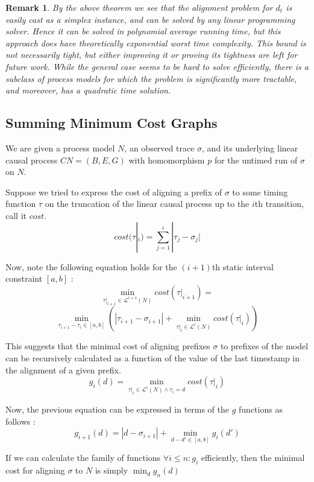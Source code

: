 \documentclass[conference]{IEEEtran}
\newtheorem{remark}{Remark}
\begin{document}
	\begin{remark}
		By the above theorem we see that the alignment problem for $d_t$ is easily cast as a simplex instance, and can be solved by any linear programming solver. 
		Hence it can be solved in polynomial average running time, but this approach does have theoretically exponential worst time complexity. 
		This bound is not necessarily tight, but either improving it or proving its tightness are left for future work. While the general case seems to be hard to solve efficiently, there is a subclass of process models for which the problem is significantly more tractable, and moreover, has a quadratic time solution. 
	\end{remark}
	
	\subsection{Summing Minimum Cost Graphs} 
	
	We are given a process model $N$, an observed trace $\sigma$, and its underlying linear causal process $CN = (B, E, G)$ with homomorphism $p$ for the untimed run of $\sigma$ on $N$. 
	
	Suppose we tried to express the cost of aligning a prefix of $\sigma$ to some timing function $\tau$ on the truncation of the linear causal process up to the $i$th transition, call it $cost$. 
	$$cost(\tau|_i) = \sum_{j = 1}^{i} |\tau_j - \sigma_j|$$
	
	Now, note the following equation holds for the $(i+1)$th static interval constraint $[a, b]$ : 
	$$\min_{\tau|_{i+1} \in \mathcal{L}^{i+1}(N)}cost(\tau|_{i+1}) = $$$$\min_{\tau_{i+1} - \tau_i\in [a, b]} (|\tau_{i+1} - \sigma_{i+1}| + \min_{\tau|_i \in \mathcal{L}^i(N) }cost(\tau|_i))$$
	
	This suggests that the minimal cost of aligning prefixes $\sigma$ to prefixes of the model can be recursively calculated as a function of the value of the last timestamp in the alignment of a given prefix. 
	$$g_i(d) = \min_{\tau|_i \in \mathcal{L}^i(N) \wedge \tau_i = d} cost(\tau|_i)$$
	
	Now, the previous equation can be expressed in terms of the $g$ functions as follows : 
	$$g_{i+1}(d) = |d - \sigma_{i+1}| + \min_{d-d' \in [a,b]} g_i(d')$$
	
	If we can calculate the family of functions $\forall i \leq n : g_i$ efficiently, then the minimal cost for aligning $\sigma$ to $N$ is simply $\min_{d} g_n(d)$
	
\end{document}
